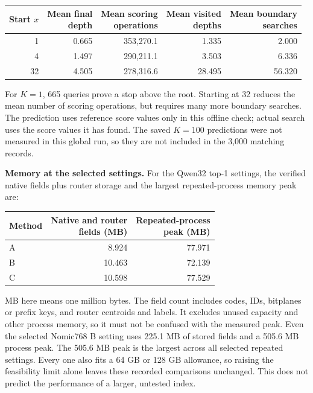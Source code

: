 \begin{center}\small
\begin{tabular}{@{}rrrrr@{}}\toprule
Start $x$ & \shortstack{Mean final\\depth} & \shortstack{Mean scoring\\operations} & \shortstack{Mean visited\\depths} & \shortstack{Mean boundary\\searches}\\\midrule
1 & 0.665 & 353,270.1 & 1.335 & 2.000\\
4 & 1.497 & 290,211.1 & 3.503 & 6.336\\
32 & 4.505 & 278,316.6 & 28.495 & 56.320\\\bottomrule
\end{tabular}
\end{center}
For $K=1$, 665 queries prove a stop above the root. Starting at 32 reduces the mean number of scoring operations, but requires many more boundary searches. The prediction uses reference score values only in this offline check; actual search uses the score values it has found. The saved $K=100$ predictions were not measured in this global run, so they are not included in the 3,000 matching records.

\textbf{Memory at the selected settings.}
For the Qwen32 top-1 settings, the verified native fields plus router storage and the largest repeated-process memory peak are:

\begin{center}\small
\begin{tabular}{@{}lrr@{}}\toprule
Method & \shortstack{Native and router\\fields (MB)} & \shortstack{Repeated-process\\peak (MB)}\\\midrule
A & 8.924 & 77.971\\
B & 10.463 & 72.139\\
C & 10.598 & 77.529\\\bottomrule
\end{tabular}
\end{center}
MB here means one million bytes. The field count includes codes, IDs, bitplanes or prefix keys, and router centroids and labels. It excludes unused capacity and other process memory, so it must not be confused with the measured peak. Even the selected Nomic768 B setting uses 225.1 MB of stored fields and a 505.6 MB process peak. The 505.6 MB peak is the largest across all selected repeated settings. Every one also fits a 64 GB or 128 GB allowance, so raising the feasibility limit alone leaves these recorded comparisons unchanged. This does not predict the performance of a larger, untested index.

